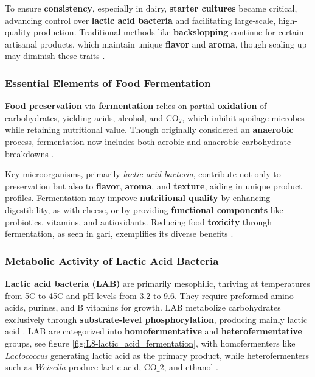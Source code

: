 To ensure \textbf{consistency}, especially in dairy, \textbf{starter cultures} became critical, advancing control over \textbf{lactic acid bacteria} and facilitating large-scale, high-quality production. Traditional methods like \textbf{backslopping} continue for certain artisanal products, which maintain unique \textbf{flavor} and \textbf{aroma}, though scaling up may diminish these traits \cite*{L8-MicroInFood}.

\subsubsection*{Essential Elements of Food Fermentation}
\textbf{Food preservation} via \textbf{fermentation} relies on partial \textbf{oxidation} of carbohydrates, yielding acids, alcohol, and CO$_2$, which inhibit spoilage microbes while retaining nutritional value. Though originally considered an \textbf{anaerobic} process, fermentation now includes both aerobic and anaerobic carbohydrate breakdowns \cite*{L8-MicroInFood}.

Key microorganisms, primarily \textit{lactic acid bacteria}, contribute not only to preservation but also to \textbf{flavor}, \textbf{aroma}, and \textbf{texture}, aiding in unique product profiles. Fermentation may improve \textbf{nutritional quality} by enhancing digestibility, as with cheese, or by providing \textbf{functional components} like probiotics, vitamins, and antioxidants. Reducing food \textbf{toxicity} through fermentation, as seen in gari, exemplifies its diverse benefits \cite*{L8-MicroInFood}.

\subsubsection*{Metabolic Activity of Lactic Acid Bacteria}
\textbf{Lactic acid bacteria (LAB)} are primarily mesophilic, thriving at temperatures from 5\textdegree C to 45\textdegree C and pH levels from 3.2 to 9.6. They require preformed amino acids, purines, and B vitamins for growth. LAB metabolize carbohydrates exclusively through \textbf{substrate-level phosphorylation}, producing mainly lactic acid \cite*{L8-MicroInFood}. LAB are categorized into \textbf{homofermentative} and \textbf{heterofermentative} groups, see figure \ref*{fig:L8-lactic_acid_fermentation}, with homofermenters like \textit{Lactococcus} generating lactic acid as the primary product, while heterofermenters such as \textit{Weisella} produce lactic acid, CO$\_2$, and ethanol \cite*{L8-MicroInFood}.

